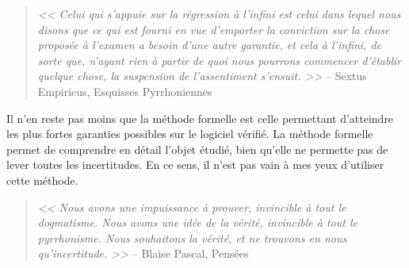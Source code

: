 	\begin{quote}
		\emph{<< Celui qui s’appuie sur la régression à l’infini est celui dans lequel nous disons que ce qui est fourni en vue d’emporter la conviction sur la chose proposée à l’examen a besoin d’une autre garantie, et cela à l’infini, de sorte que, n’ayant rien à partir de quoi nous pourrons commencer d’établir quelque chose, la suspension de l’assentiment s’ensuit. >>} -- Sextus Empiricus, Esquisses Pyrrhoniennes
	\end{quote}

	Il n'en reste pas moins que la méthode formelle est celle permettant d'atteindre les plus fortes garanties possibles sur le logiciel vérifié. La méthode formelle permet de comprendre en détail l'objet étudié, bien qu'elle ne permette pas de lever toutes les incertitudes. En ce sens, il n'est pas vain à mes yeux d'utiliser cette méthode.

	\begin{quote}
		\emph{<< Nous avons une impuissance à prouver, invincible à tout le dogmatisme. Nous avons une idée de la vérité, invincible à tout le pyrrhonisme. Nous souhaitons la vérité, et ne trouvons en nous qu'incertitude. >>} -- Blaise Pascal, Pensées
	\end{quote}

